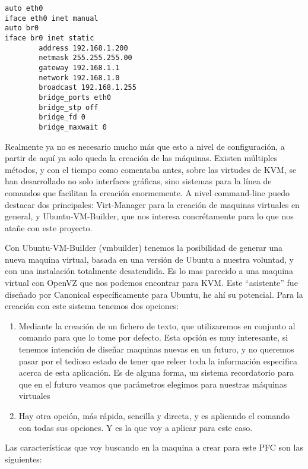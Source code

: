 \begin{lstlisting}[style=bash]
auto eth0
iface eth0 inet manual
auto br0
iface br0 inet static
        address 192.168.1.200
        netmask 255.255.255.00
        gateway 192.168.1.1
        network 192.168.1.0
        broadcast 192.168.1.255
        bridge_ports eth0
        bridge_stp off
        bridge_fd 0
        bridge_maxwait 0
\end{lstlisting}

Realmente ya no es necesario mucho más que esto a nivel de configuración, a partir de aquí ya solo queda la creación de las máquinas. Existen múltiples métodos, y con el tiempo como comentaba antes, sobre las virtudes de KVM, se han desarrollado no solo interfaces gráficas, sino sistemas para la línea de comandos que facilitan la creación enormemente. A nivel command-line puedo destacar dos principales: Virt-Manager para la creación de maquinas virtuales en general, y Ubuntu-VM-Builder, que nos interesa concrétamente para lo que nos atañe con este proyecto.

Con Ubuntu-VM-Builder (vmbuilder) tenemos la posibilidad de generar una nueva maquina virtual, basada en una versión de Ubuntu a nuestra voluntad, y con una instalación totalmente desatendida. Es lo mas parecido a una maquina virtual con OpenVZ que nos podemos encontrar para KVM. Este ``asistente'' fue diseñado por Canonical específicamente para Ubuntu, he ahí su potencial. Para la creación con este sistema tenemos dos opciones:

\begin{enumerate}
\item Mediante la creación de un fichero de texto, que utilizaremos en conjunto al comando para que lo tome por defecto. Esta opción es muy interesante, si tenemos intención de diseñar maquinas nuevas en un futuro, y no queremos pasar por el tedioso estado de tener que releer toda la información especifica acerca de esta aplicación. Es de alguna forma, un sistema recordatorio para que en el futuro veamos que parámetros elegimos para nuestras máquinas virtuales
\item Hay otra opción, más rápida, sencilla y directa, y es aplicando el comando con todas sus opciones. Y es la que voy a aplicar para este caso.
\end{enumerate}

Las características que voy buscando en la maquina a crear para este PFC son las siguientes:


